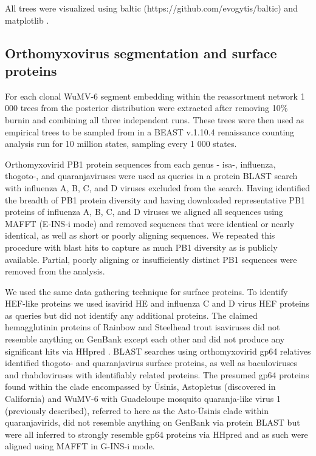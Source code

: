 \documentclass[11pt]{article}
\begin{document}
All trees were visualized using baltic (https://github.com/evogytis/baltic) and matplotlib \citep{hunter_matplotlib_2007}.


\subsection{Orthomyxovirus segmentation and surface proteins}

For each clonal WuMV-6 segment embedding within the reassortment network 1 000 trees from the posterior distribution were extracted after removing 10\% burnin and combining all three independent runs.
These trees were then used as empirical trees to be sampled from in a BEAST v.1.10.4 \citep{suchard_bayesian_2018} renaissance counting analysis \citep{lemey_counting_2012} run for 10 million states, sampling every 1 000 states.

Orthomyxovirid PB1 protein sequences from each genus - isa-, influenza, thogoto-, and quaranjaviruses were used as queries in a protein BLAST \citep{altschul_basic_1990} search with influenza A, B, C, and D viruses excluded from the search.
Having identified the breadth of PB1 protein diversity and having downloaded representative PB1 proteins of influenza A, B, C, and D viruses we aligned all sequences using MAFFT \citep{katoh_mafft_2005} (E-INS-i mode) and removed sequences that were identical or nearly identical, as well as short or poorly aligning sequences.
We repeated this procedure with blast hits to capture as much PB1 diversity as is publicly available.
Partial, poorly aligning or insufficiently distinct PB1 sequences were removed from the analysis.

We used the same data gathering technique for surface proteins.
To identify HEF-like proteins we used isavirid HE and influenza C and D virus HEF proteins as queries but did not identify any additional proteins.
The claimed hemagglutinin proteins of Rainbow and Steelhead trout isaviruses did not resemble anything on GenBank except each other and did not produce any significant hits via HHpred \citep{finn_hmmer_2011}.
BLAST searches using orthomyxovirid gp64 relatives identified thogoto- and quaranjavirus surface proteins, as well as baculoviruses and rhabdoviruses with identifiably related proteins.
The presumed gp64 proteins found within the clade encompassed by \={U}sinis, Astopletus (discovered in California) and WuMV-6 with Guadeloupe mosquito quaranja-like virus 1 (previously described), referred to here as the Asto-\={U}sinis clade within quaranjavirids, did not resemble anything on GenBank via protein BLAST but were all inferred to strongly resemble gp64 proteins via HHpred and as such were aligned using MAFFT in G-INS-i mode.
\end{document}
